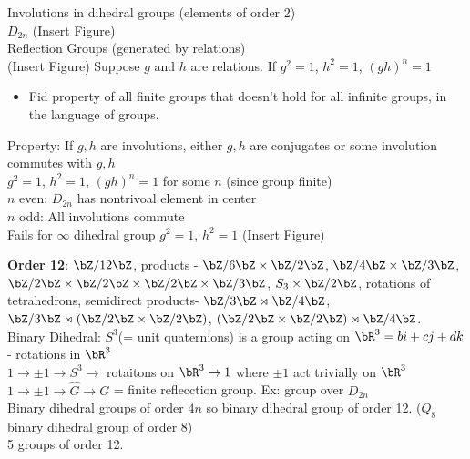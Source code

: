 \noindent
Involutions in dihedral groups (elements of order 2) \\
$D_{2n}$ (Insert Figure) \\

\noindent
Reflection Groups (generated by relations)\\
(Insert Figure) Suppose $g$ and $h$ are relations. If $g^2=1$, $h^2=1$, $(gh)^n=1$  \\

\begin{itemize}
    \item Fid property of all finite groups that doesn't hold for all infinite groups, in the language of groups. 
\end{itemize}

\noindent
Property: If $g,h$ are involutions, either $g,h$ are conjugates or some involution commutes with $g,h$ \\
$g^2=1$, $h^2=1$, $(gh)^n=1$ for some $n$ (since group finite) \\
$n$ even: $D_{2n}$ has nontrivoal element in center \\
$n$ odd: All involutions commute \\
Fails for $\infty$ dihedral group $g^2=1$, $h^2=1$ (Insert Figure) 

\noindent
\textbf{Order 12}: $\bZ/12\bZ$, products - $\bZ/6\bZ \times \bZ/2\bZ$, $\bZ/4\bZ \times \bZ/3\bZ$, $\bZ/2\bZ \times \bZ/2\bZ \times \bZ/2\bZ \times \bZ/3\bZ$, $S_3 \times \bZ/2\bZ$, rotations of tetrahedrons, semidirect products- $\bZ/3\bZ \rtimes \bZ/4\bZ$, $\bZ/3\bZ \rtimes (\bZ/2\bZ \times \bZ/2\bZ)$, $(\bZ/2\bZ \times \bZ/2\bZ) \rtimes \bZ/4\bZ$. \\

\noindent
Binary Dihedral: $S^3$(= unit quaternions) is a group acting on $\bR^3 = bi + cj + dk$ - rotations in $\bR^3$ \\
$1 \to \pm 1 \to S^3 \to$ rotaitons on $\bR^3 \to 1$ where $\pm 1$ act trivially on $\bR^3$ \\
$1 \to \pm 1 \to \hat{G} \to G$ = finite reflecction group. \quad Ex: group over $D_{2n}$ \\
Binary dihedral groups of order $4n$ so binary dihedral group of order 12. ($Q_8$ binary dihedral group of order 8) \\
5 groups of order 12. 
